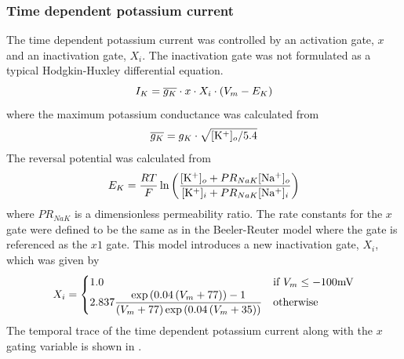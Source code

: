 \subsubsection{Time dependent potassium current}
The time dependent potassium current was controlled by an activation gate, $x$
and an inactivation gate, $X_i$. The inactivation gate was not formulated as a
typical Hodgkin-Huxley differential equation. 
\begin{equation}
  I_K=\overline{g_{K}}\cdot x\cdot X_i\cdot \left( V_m-E_{K} \right)
\end{equation}
where the maximum potassium conductance was calculated from
\begin{equation}
  \overline{g_{K}}=g_{K}\cdot \sqrt{ [\mathrm{K^+}]_{o} /5.4}
\end{equation}
The reversal potential was calculated from
\begin{equation}
  E_K=\dfrac{RT}{F}\ln\left( \dfrac{ [\mathrm{K^+}]_{o} +PR_{NaK}
       [\mathrm{Na^+}]_{o} }{ [\mathrm{K^+}]_{i} +PR_{NaK} [\mathrm{Na^+}]_{i} } \right)
\end{equation}
where $PR_{NaK}$ is a dimensionless permeability ratio. The rate constants
for the $x$ gate were 
defined to be the same as in the Beeler-Reuter model where the gate is
referenced as the $x1$ gate. This model introduces a new inactivation gate,
$X_i$, which was given by
\begin{gather}
  \begin{aligned}
    X_i &=
    \begin{cases}
      1.0 & \text{if $V_m \leq -100 \mathrm{mV}$} \\
      2.837 \dfrac{\exp\left( 0.04\left( V_m+77 \right) \right)-1}{\left( V_m+77 \right)
        \exp\left( 0.04\left( V_m+35 \right) \right)} & \text{otherwise}
    \end{cases} \\ 
  \end{aligned}
\end{gather}
The temporal trace of the time dependent potassium current along with the $x$
gating variable is shown in .
